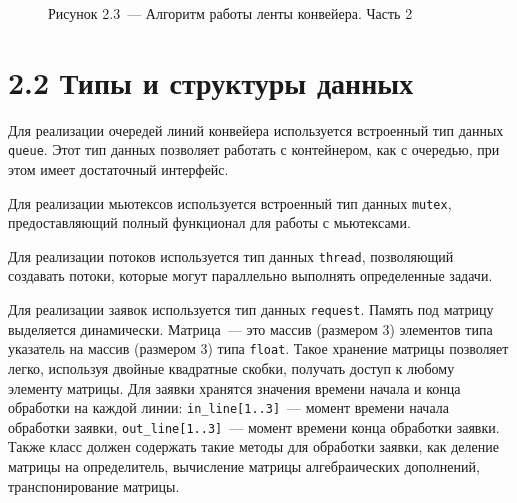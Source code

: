 \documentclass[12pt, a4paper]{report}
\begin{document}
	\begin{figure}[H]
		\caption*{Рисунок 2.3~--- Алгоритм работы ленты конвейера. Часть 2}
	\end{figure}
	
	\section*{2.2 Типы и структуры данных}
	
	Для реализации очередей линий конвейера используется встроенный тип данных \verb|queue|. Этот тип данных позволяет работать с контейнером, как с очередью, при этом имеет достаточный интерфейс.
	
	Для реализации мьютексов используется встроенный тип данных \verb|mutex|, предоставляющий полный функционал для работы с мьютексами.
	
	Для реализации потоков используется тип данных \verb|thread|, позволяющий создавать потоки, которые могут параллельно выполнять определенные задачи.
	
	Для реализации заявок используется тип данных \verb|request|. Память под матрицу выделяется динамически. Матрица~--- это массив (размером 3) элементов типа указатель на массив (размером 3) типа \verb|float|. Такое хранение матрицы позволяет легко, используя двойные квадратные скобки, получать доступ к любому элементу матрицы. Для заявки хранятся значения времени начала и конца обработки на каждой линии: \verb|in_line[1..3]|~--- момент времени начала обработки заявки, \verb|out_line[1..3]|~--- момент времени конца обработки заявки. Также класс должен содержать такие методы для обработки заявки, как деление матрицы на определитель, вычисление матрицы алгебраических дополнений, транспонирование матрицы.
	
\end{document}
